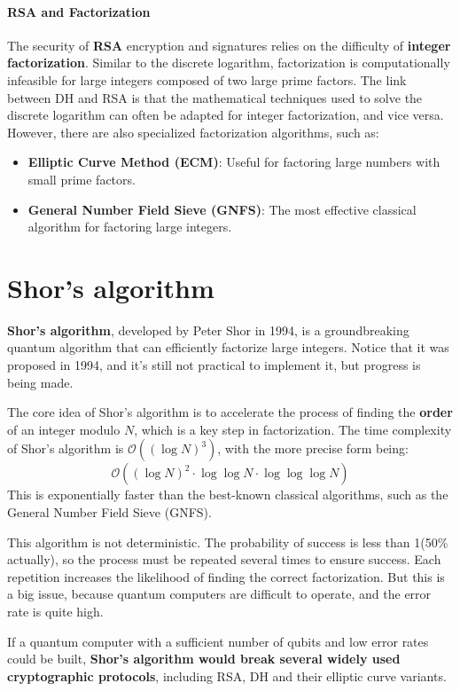 \paragraph{RSA and Factorization}  
The security of \textbf{RSA} encryption and signatures relies on the
difficulty of \textbf{integer factorization}. Similar to the discrete
logarithm, factorization is computationally infeasible for large
integers composed of two large prime factors. The link between DH and
RSA is that the mathematical techniques used to solve the discrete
logarithm can often be adapted for integer factorization, and vice
versa. However, there are also specialized factorization algorithms,
such as:  
\begin{itemize}
    \item \textbf{Elliptic Curve Method (ECM)}: Useful for factoring
      large numbers with small prime factors.  
    \item \textbf{General Number Field Sieve (GNFS)}: The most
      effective classical algorithm for factoring large integers.  
\end{itemize}

\section{Shor's algorithm}
\textbf{Shor's algorithm}, developed by Peter Shor in 1994, is a
groundbreaking quantum algorithm that can efficiently factorize large
integers. Notice that it was proposed in 1994, and it's still not  
practical to implement it, but progress is being made.

The core idea of Shor's algorithm is to accelerate the process of
finding the \textbf{order} of an integer modulo \(N\), which is a key
step in factorization. The time complexity of Shor's algorithm is
\(\mathcal{O}((\log N)^3)\), with the more precise form being:  
\[
\mathcal{O}((\log N)^2 \cdot \log \log N \cdot \log \log \log N)
\]  
This is exponentially faster than the best-known classical algorithms,
such as the General Number Field Sieve (GNFS).

This algorithm is not deterministic. The probability of success is
less than 1(50\% actually), so the process must be repeated several
times to ensure success. Each repetition increases the likelihood of
finding the correct factorization. But this is a big issue, because
quantum computers are difficult to operate, and the error rate is 
quite high.

If a quantum computer with a sufficient number of qubits and low error
rates could be built, \textbf{Shor's algorithm would break several
widely used cryptographic protocols}, including RSA, DH and their
elliptic curve variants. 

